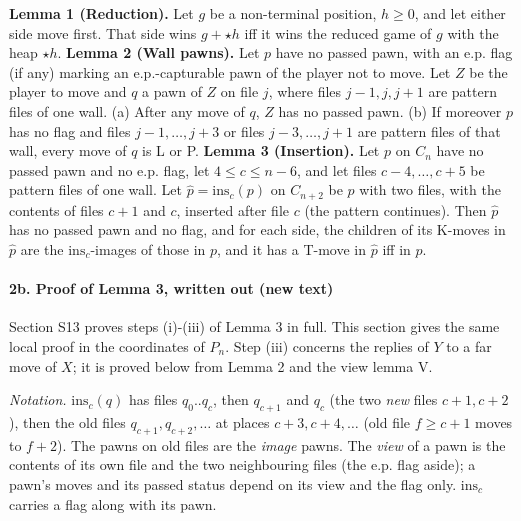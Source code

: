\textbf{Lemma 1 (Reduction).} Let $g$ be a non-terminal position, $h\ge0$, and let either side move first. That side wins $g+\star h$ iff it wins the reduced game of $g$ with the heap $\star h$. \textbf{Lemma 2 (Wall pawns).} Let $p$ have no passed pawn, with an e.p. flag (if any) marking an e.p.-capturable pawn of the player not to move. Let $Z$ be the player to move and $q$ a pawn of $Z$ on file $j$, where files $j-1,j,j+1$ are pattern files of one wall. (a) After any move of $q$, $Z$ has no passed pawn. (b) If moreover $p$ has no flag and files $j-1,\dots,j+3$ or files $j-3,\dots,j+1$ are pattern files of that wall, every move of $q$ is L or P. \textbf{Lemma 3 (Insertion).} Let $p$ on $C_n$ have no passed pawn and no e.p. flag, let $4\le c\le n-6$, and let files $c-4,\dots,c+5$ be pattern files of one wall. Let $\hat p=\mathrm{ins}_c(p)$ on $C_{n+2}$ be $p$ with two files, with the contents of files $c+1$ and $c$, inserted after file $c$ (the pattern continues). Then $\hat p$ has no passed pawn and no flag, and for each side, the children of its K-moves in $\hat p$ are the $\mathrm{ins}_c$-images of those in $p$, and it has a T-move in $\hat p$ iff in $p$.

\paragraph*{2b. Proof of Lemma 3, written out (new text)}
Section S13 proves steps (i)-(iii) of Lemma 3 in full. This section gives the same local proof in the coordinates of $P_n$. Step (iii) concerns the replies of $Y$ to a far move of $X$; it is proved below from Lemma 2 and the view lemma V.

\emph{Notation.} $\mathrm{ins}_c(q)$ has files $q_0..q_c$, then $q_{c+1}$ and $q_c$ (the two \emph{new} files $c+1,c+2$), then the old files $q_{c+1},q_{c+2},\dots$ at places $c+3,c+4,\dots$ (old file $f\ge c+1$ moves to $f+2$). The pawns on old files are the \emph{image} pawns. The \emph{view} of a pawn is the contents of its own file and the two neighbouring files (the e.p. flag aside); a pawn's moves and its passed status depend on its view and the flag only. $\mathrm{ins}_c$ carries a flag along with its pawn.

